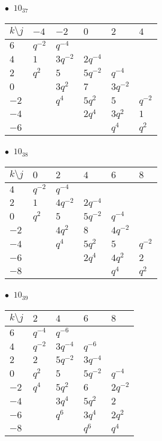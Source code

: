 %
\begin{minipage}{\linewidth}
$\bullet\ $ $10_{37}$ \vspace{0.5em} \\
\begin{tabular}{l|lllll}
$k \setminus j$ & $-4$ & $-2$ & $0$ & $2$ & $4$ \\
\hline
$6$ & $q^{-2}$ & $q^{-4}$ &  &  &  \\
$4$ & $1$ & $3q^{-2}$ & $2q^{-4}$ &  &  \\
$2$ & $q^{2}$ & $5$ & $5q^{-2}$ & $q^{-4}$ &  \\
$0$ &  & $3q^{2}$ & $7$ & $3q^{-2}$ &  \\
$-2$ &  & $q^{4}$ & $5q^{2}$ & $5$ & $q^{-2}$ \\
$-4$ &  &  & $2q^{4}$ & $3q^{2}$ & $1$ \\
$-6$ &  &  &  & $q^{4}$ & $q^{2}$ \\
\end{tabular}
\vspace{2em}
\end{minipage}
%
\begin{minipage}{\linewidth}
$\bullet\ $ $10_{38}$ \vspace{0.5em} \\
\begin{tabular}{l|lllll}
$k \setminus j$ & $0$ & $2$ & $4$ & $6$ & $8$ \\
\hline
$4$ & $q^{-2}$ & $q^{-4}$ &  &  &  \\
$2$ & $1$ & $4q^{-2}$ & $2q^{-4}$ &  &  \\
$0$ & $q^{2}$ & $5$ & $5q^{-2}$ & $q^{-4}$ &  \\
$-2$ &  & $4q^{2}$ & $8$ & $4q^{-2}$ &  \\
$-4$ &  & $q^{4}$ & $5q^{2}$ & $5$ & $q^{-2}$ \\
$-6$ &  &  & $2q^{4}$ & $4q^{2}$ & $2$ \\
$-8$ &  &  &  & $q^{4}$ & $q^{2}$ \\
\end{tabular}
\vspace{2em}
\end{minipage}
%
\begin{minipage}{\linewidth}
$\bullet\ $ $10_{39}$ \vspace{0.5em} \\
\begin{tabular}{l|llll}
$k \setminus j$ & $2$ & $4$ & $6$ & $8$ \\
\hline
$6$ & $q^{-4}$ & $q^{-6}$ &  &  \\
$4$ & $q^{-2}$ & $3q^{-4}$ & $q^{-6}$ &  \\
$2$ & $2$ & $5q^{-2}$ & $3q^{-4}$ &  \\
$0$ & $q^{2}$ & $5$ & $5q^{-2}$ & $q^{-4}$ \\
$-2$ & $q^{4}$ & $5q^{2}$ & $6$ & $2q^{-2}$ \\
$-4$ &  & $3q^{4}$ & $5q^{2}$ & $2$ \\
$-6$ &  & $q^{6}$ & $3q^{4}$ & $2q^{2}$ \\
$-8$ &  &  & $q^{6}$ & $q^{4}$ \\
\end{tabular}
\vspace{2em}
\end{minipage}
